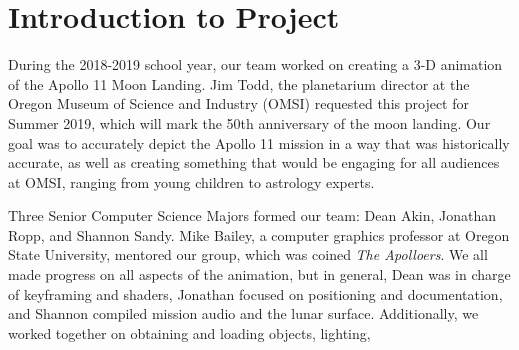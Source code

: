 \documentclass[onecolumn, draftclsnofoot,10pt, compsoc]{IEEEtran}
\begin{document}
\section{Introduction to Project}

During the 2018-2019 school year, our team worked on creating a 3-D animation of the  Apollo 11 Moon Landing. Jim Todd, the planetarium director at the Oregon Museum of Science and Industry (OMSI) requested this project for Summer 2019, which will mark the 50th anniversary of the moon landing. Our goal was to accurately depict the Apollo 11 mission in a way that was historically accurate, as well as creating something that would be engaging for all audiences at OMSI, ranging from young children to astrology experts. 

Three Senior Computer Science Majors formed our team: Dean Akin, Jonathan Ropp, and Shannon Sandy. Mike Bailey, a computer graphics professor at Oregon State University, mentored our group, which was coined \textit{The Apolloers}. We all made progress on all aspects of the animation, but in general, Dean was in charge of keyframing and shaders, Jonathan focused on positioning and documentation, and Shannon compiled mission audio and the lunar surface. Additionally, we worked together on obtaining and loading objects, lighting, 
\end{document}
